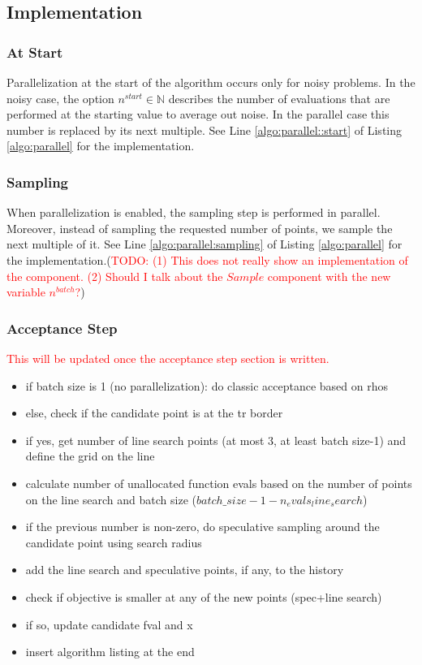 \subsection{Implementation}\label{subsec:parallelization::implementation}

\subsubsection{At Start}

Parallelization at the start of the algorithm occurs only for noisy problems. In the noisy case, the
option $n^{start} \in \mathbb{N}$ describes the number of evaluations that are performed at the
starting value to average out noise. In the parallel case this number is replaced by its next
multiple. See Line \ref{algo:parallel::start} of Listing \ref{algo:parallel} for the implementation.

\subsubsection{Sampling}

When parallelization is enabled, the sampling step is performed in parallel. Moreover, instead of
sampling the requested number of points, we sample the next multiple of it. See Line
\ref{algo:parallel:sampling} of Listing \ref{algo:parallel} for the
implementation.(\textcolor{red}{TODO: (1) This does not really show an implementation of the
component. (2) Should I talk about the $Sample$ component with the new variable $n^{batch}$?})

\subsubsection{Acceptance Step}

\textcolor{red}{This will be updated once the acceptance step section is written.}

\begin{itemize}
    \item if batch size is 1 (no parallelization): do classic acceptance based on rhos
    \item else, check if the candidate point is at the tr border
    \item if yes, get number of line search points (at most 3, at least batch size-1) and define the
        grid on the line
    \item calculate number of unallocated function evals based on the number of points on the line
        search and batch size ($batch\_size-1-n_evals_line_search$) 
    \item if the previous number is non-zero, do speculative sampling around the candidate point
        using search radius
    \item add the line search and speculative points, if any, to the history
    \item check if objective is smaller at any of the new points (spec+line search)
    \item if so, update candidate fval and x
    \item insert algorithm listing at the end
\end{itemize}

